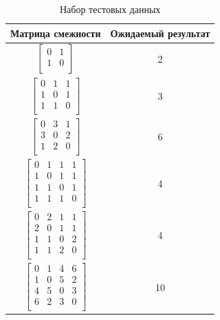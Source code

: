 \documentclass[a4paper,14pt]{report}
\begin{document}
\begin{table}[h]
	\caption{Набор тестовых данных}
		\begin{tabular}{|c | c |}
	 	\hline
		Матрица смежности & Ожидаемый результат \\ [0.5ex]
	 	\hline\hline
		$\begin{bmatrix}
		0 & 1 \\
		1 & 0 \\
		\end{bmatrix}$ & 2 \\
		\hline

		$\begin{bmatrix}
		0 & 1 & 1 \\
		1 & 0 & 1 \\
		1 & 1 & 0 \\
		\end{bmatrix}$ & 3 \\
		\hline

		$\begin{bmatrix}
		0 & 3 & 1 \\
		3 & 0 & 2 \\
		1 & 2 & 0 \\
		\end{bmatrix}$ & 6 \\
		\hline

		$\begin{bmatrix}
		0 & 1 & 1 & 1 \\
		1 & 0 & 1 & 1 \\
		1 & 1 & 0 & 1 \\
		1 & 1 & 1 & 0 \\
		\end{bmatrix}$ & 4 \\
		\hline

		$\begin{bmatrix}
		0 & 2 & 1 & 1 \\
		2 & 0 & 1 & 1 \\
		1 & 1 & 0 & 2 \\
		1 & 1 & 2 & 0 \\
		\end{bmatrix}$ & 4 \\
		\hline

		$\begin{bmatrix}
		0 & 1 & 4 & 6 \\
		1 & 0 & 5 & 2 \\
		4 & 5 & 0 & 3 \\
		6 & 2 & 3 & 0 \\
		\end{bmatrix}$ & 10 \\
		\hline


\end{tabular}
\end{table}
\end{document}
